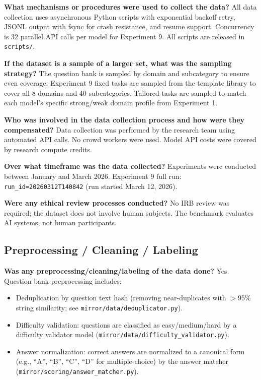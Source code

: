 \textbf{What mechanisms or procedures were used to collect the data?}
All data collection uses asynchronous Python scripts with exponential backoff retry,
JSONL output with fsync for crash resistance, and resume support. Concurrency is
32 parallel API calls per model for Experiment 9. All scripts are released in
\texttt{scripts/}.

\textbf{If the dataset is a sample of a larger set, what was the sampling strategy?}
The question bank is sampled by domain and subcategory to ensure even coverage.
Experiment 9 fixed tasks are sampled from the template library to cover all 8 domains
and 40 subcategories. Tailored tasks are sampled to match each model's specific
strong/weak domain profile from Experiment 1.

\textbf{Who was involved in the data collection process and how were they compensated?}
Data collection was performed by the research team using automated API calls. No crowd
workers were used. Model API costs were covered by research compute credits.

\textbf{Over what timeframe was the data collected?}
Experiments were conducted between January and March 2026. Experiment 9 full run:
\texttt{run\_id=20260312T140842} (run started March 12, 2026).

\textbf{Were any ethical review processes conducted?}
No IRB review was required; the dataset does not involve human subjects. The
benchmark evaluates AI systems, not human participants.

\subsection*{Preprocessing / Cleaning / Labeling}

\textbf{Was any preprocessing/cleaning/labeling of the data done?}
Yes. Question bank preprocessing includes:
\begin{itemize}
  \item Deduplication by question text hash (removing near-duplicates with $>$95\%
    string similarity; see \texttt{mirror/data/deduplicator.py}).
  \item Difficulty validation: questions are classified as easy/medium/hard by
    a difficulty validator model (\texttt{mirror/data/difficulty\_validator.py}).
  \item Answer normalization: correct answers are normalized to a canonical form
    (e.g., ``A'', ``B'', ``C'', ``D'' for multiple-choice) by the answer matcher
    (\texttt{mirror/scoring/answer\_matcher.py}).
\end{itemize}

